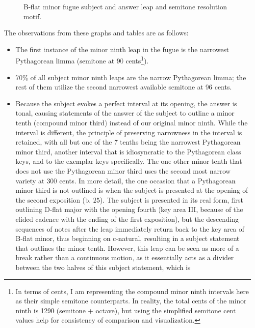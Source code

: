 \begin{figure}[H]
\vspace{1.5em}
    \centering
    \caption{B-flat minor fugue subject and answer leap and semitone resolution motif. }
\end{figure}    The observations from these graphs and tables are as follows:

\begin{itemize}
\tightlist
\item
  The first instance of the minor ninth leap in the fugue is the
  narrowest Pythagorean limma (semitone at 90
  cents\footnote{In terms of cents, I am representing the compound minor ninth intervals here as their simple semitone counterparts. In reality, the total cents of the minor ninth is 1290 (semitone + octave), but using the simplified semitone cent values help for consistency of comparison and visualization.}).
\item
  70\% of all subject minor ninth leaps are the narrow Pythagorean
  limma; the rest of them utilize the second narrowest available
  semitone at 96 cents.
\item
  Because the subject evokes a perfect interval at its opening, the
  answer is tonal, causing statements of the answer of the subject to
  outline a minor tenth (compound minor third) instead of our original
  minor ninth. While the interval is different, the principle of
  preserving narrowness in the interval is retained, with all but one of
  the 7 tenths being the narrowest Pythagorean minor third, another
  interval that is idiosyncratic to the Pythagorean class keys, and to
  the exemplar keys specifically. The one other minor tenth that does
  not use the Pythagorean minor third uses the second most narrow
  variety at 300 cents. In more detail, the one occasion that a
  Pythagorean minor third is not outlined is when the subject is
  presented at the opening of the second exposition (b. 25). The subject
  is presented in its real form, first outlining D-flat major with the
  opening fourth (key area III, because of the elided cadence with the
  ending of the first exposition), but the descending sequences of notes
  after the leap immediately return back to the key area of B-flat
  minor, thus beginning on c-natural, resulting in a subject statement
  that outlines the minor tenth. However, this leap can be seen as more
  of a break rather than a continuous motion, as it essentially acts as
  a divider between the two halves of this subject statement, which is

\end{itemize}
